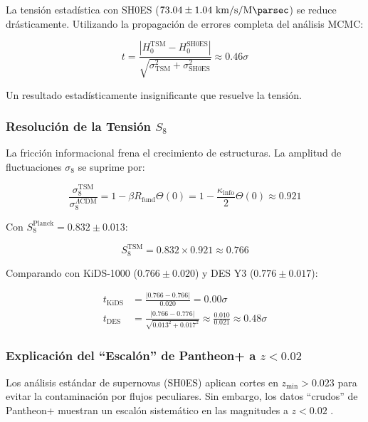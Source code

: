 \documentclass[11pt, a4paper]{article}
\theoremstyle{plain}
\theoremstyle{definition}
\newcommand{\Rfactor}{R_{\text{fund}}}
\newcommand{\Kinfo}{\kappa_{\text{info}}}
\begin{document}
La tensión estadística con SH0ES ($73.04 \pm 1.04\ \si{\kilo\meter\per\second\per\mega\parsec}$) se reduce drásticamente. Utilizando la propagación de errores completa del análisis MCMC:

\begin{equation}
t = \frac{|H_0^{\text{TSM}} - H_0^{\text{SH0ES}}|}{\sqrt{\sigma_{\text{TSM}}^2 + \sigma_{\text{SH0ES}}^2}} \approx 0.46\sigma
\end{equation}

Un resultado estadísticamente insignificante que resuelve la tensión.

\subsubsection{Resolución de la Tensión \texorpdfstring{$S_8$}{S8}}

La fricción informacional frena el crecimiento de estructuras. La amplitud de fluctuaciones $\sigma_8$ se suprime por:

\begin{equation}
\frac{\sigma_8^{\text{TSM}}}{\sigma_8^{\Lambda\text{CDM}}} = 1 - \beta\Rfactor \Theta(0) = 1 - \frac{\Kinfo}{2} \Theta(0) \approx 0.921
\end{equation}

Con $S_8^{\text{Planck}} = 0.832 \pm 0.013$:

\begin{equation}
S_8^{\text{TSM}} = 0.832 \times 0.921 \approx 0.766
\end{equation}

Comparando con KiDS-1000 ($0.766 \pm 0.020$) y DES Y3 ($0.776 \pm 0.017$):

\begin{align}
t_{\text{KiDS}} &= \frac{|0.766 - 0.766|}{0.020} = 0.00\sigma \\
t_{\text{DES}} &= \frac{|0.766 - 0.776|}{\sqrt{0.013^2 + 0.017^2}} \approx \frac{0.010}{0.021} \approx 0.48\sigma
\end{align}

\subsubsection{Explicación del ``Escalón'' de Pantheon+ a \texorpdfstring{$z < 0.02$}{z < 0.02}}

Los análisis estándar de supernovas (SH0ES) aplican cortes en $z_{\text{min}} > 0.023$ para evitar la contaminación por flujos peculiares. Sin embargo, los datos ``crudos'' de Pantheon+ muestran un escalón sistemático en las magnitudes a $z < 0.02$ \cite{Brout2022}.
\end{document}
